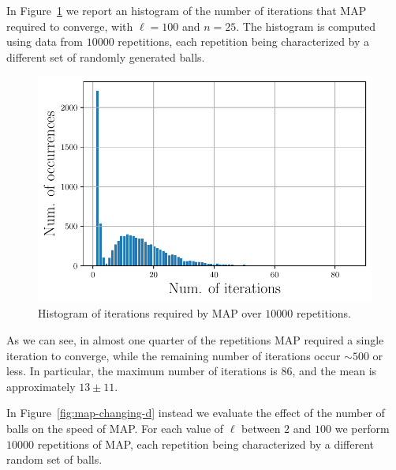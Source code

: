 \documentclass{article}
\begin{document}
In Figure~\ref{fig:map-histogram} we report an histogram of the number of iterations that MAP required to converge, with $\ell = 100$ and $n = 25$. The histogram is computed using data from $10000$ repetitions, each repetition being characterized by a different set of randomly generated balls.

\begin{figure}[ht]
\vskip 0.2in
\begin{center}
\centerline{\includegraphics[width=\columnwidth]{Figures/MAP_histogram}}
\caption{Histogram of iterations required by MAP over $10000$ repetitions.}
\label{fig:map-histogram}
\end{center}
\vskip -0.2in
\end{figure}

As we can see, in almost one quarter of the repetitions MAP required a single iteration to converge, while the remaining number of iterations occur $\sim 500$ or less. In particular, the maximum number of iterations is $86$, and the mean is approximately $13 \pm 11$.

In Figure~\ref{fig:map-changing-d} instead we evaluate the effect of the number of balls on the speed of MAP. For each value of $\ell$ between $2$ and $100$ we perform $10000$ repetitions of MAP, each repetition being characterized by a different random set of balls.
\end{document}
